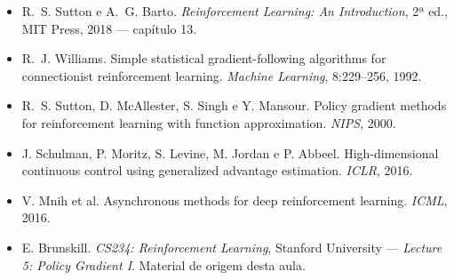 \documentclass[11pt]{article}
\begin{document}
\begin{itemize}[itemsep=0.15em]
  \item R.~S. Sutton e A.~G. Barto. \emph{Reinforcement Learning: An
    Introduction}, 2ª ed., MIT Press, 2018 --- capítulo 13.
  \item R.~J. Williams. Simple statistical gradient-following algorithms for
    connectionist reinforcement learning. \emph{Machine Learning}, 8:229--256, 1992.
  \item R.~S. Sutton, D. McAllester, S. Singh e Y. Mansour. Policy gradient
    methods for reinforcement learning with function approximation. \emph{NIPS}, 2000.
  \item J. Schulman, P. Moritz, S. Levine, M. Jordan e P. Abbeel.
    High-dimensional continuous control using generalized advantage estimation.
    \emph{ICLR}, 2016.
  \item V. Mnih et al. Asynchronous methods for deep reinforcement learning.
    \emph{ICML}, 2016.
  \item E. Brunskill. \emph{CS234: Reinforcement Learning}, Stanford University
    --- \emph{Lecture 5: Policy Gradient I}. Material de origem desta aula.
\end{itemize}
\end{document}
